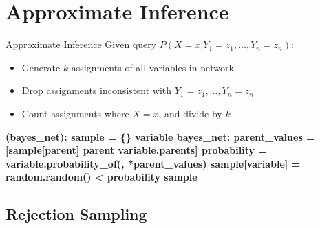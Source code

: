 \documentclass[14pt]{beamer}
\begin{document}
\section{Approximate Inference}
\begin{frame}[fragile]{Approximate Inference}
Given query $P(X=x|Y_1=z_1,\ldots,Y_n=z_n)$:
\begin{itemize}
\item Generate $k$ assignments of all variables in network
\item Drop assignments inconsistent with {\small$Y_1=z_1,\ldots,Y_n=z_n$}
\item Count assignments where $X\!=\!x$, and divide by $k$
\end{itemize}
\pause
\begin{semiverbatim}\scriptsize\bfseries
{} (bayes_net):
    \pause{}
    sample = \{\}
     variable  bayes_net:
        \pause{}
        parent_values = [sample[parent]  parent  variable.parents]
        \pause{}
        probability = variable.probability_of(, *parent_values)
        \pause{}
        sample[variable] = random.random() < probability
    \pause{}
     sample
\end{semiverbatim}
\end{frame}


\subsection{Rejection Sampling}
\end{document}
